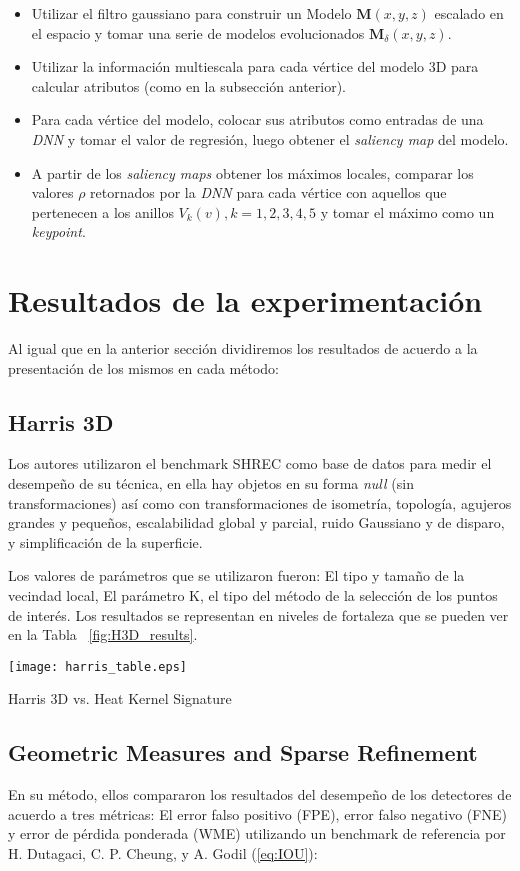 \documentclass[conference]{IEEEtran}
\begin{document}
\begin{itemize}
\item Utilizar el filtro gaussiano para construir un Modelo $\bm{M}(x, y, z)$ escalado en el espacio y tomar una serie de modelos evolucionados $\bm{M}_{\delta}(x, y, z)$.
\item Utilizar la información multiescala para cada vértice del modelo 3D para calcular atributos (como en la subsección anterior).
\item Para cada vértice del modelo, colocar sus atributos como entradas de una \textit{DNN} y tomar el valor de regresión, luego obtener el \textit{saliency map} del modelo.
\item A partir de los \textit{saliency maps} obtener los máximos locales, comparar los valores $\rho$ retornados por la \textit{DNN} para cada vértice con aquellos que pertenecen a los anillos $V_{k}(v), k = 1, 2, 3, 4, 5$ y tomar el máximo como un \textit{keypoint}.
\end{itemize}

\section{Resultados de la experimentación}
Al igual que en la anterior sección dividiremos los resultados de acuerdo a la presentación de los mismos en cada método:

\subsection{Harris 3D}
Los autores utilizaron el benchmark SHREC como base de datos para medir el desempeño de su técnica, en ella hay objetos en su forma \textit{null} (sin transformaciones) así como con transformaciones de isometría, topología, agujeros grandes y pequeños, escalabilidad global y parcial, ruido Gaussiano y de disparo, y simplificación de la superficie.

Los valores de parámetros que se utilizaron fueron: El tipo y tamaño de la vecindad local, El parámetro K, el tipo del método de la selección de los puntos de interés. Los resultados se representan en niveles de fortaleza que se pueden ver en la Tabla ~\ref{fig:H3D_results}.

\begin{table}
\texttt{[image: harris\_table.eps]}
\caption{Harris 3D vs. Heat Kernel Signature \cite{harris}}
\label{fig:H3D_results}
\end{table}

\subsection{Geometric Measures and Sparse Refinement}
En su método, ellos compararon los resultados del desempeño de los detectores de acuerdo a tres métricas: El error falso positivo (FPE), error falso negativo (FNE) y error de pérdida ponderada (WME) utilizando un benchmark de referencia por H. Dutagaci, C. P. Cheung, y A. Godil (\ref{eq:IOU}): 
\end{document}
